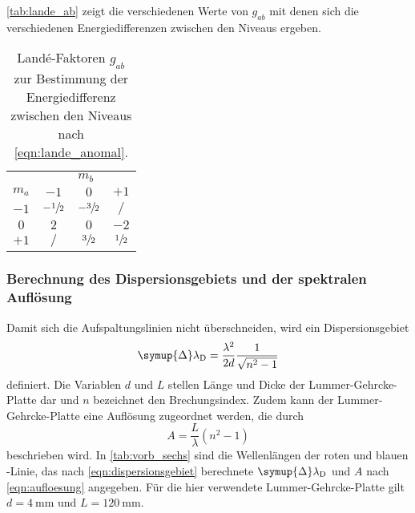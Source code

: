     \autoref{tab:lande_ab} zeigt die verschiedenen Werte von $g_{ab}$ mit denen sich die verschiedenen Energiedifferenzen zwischen den Niveaus ergeben.

    \begin{table}
        \centering
        \caption{Landé-Faktoren $g_{ab}$ zur Bestimmung der Energiedifferenz zwischen den Niveaus nach \autoref{eqn:lande_anomal}.}
        \label{tab:lande_ab}
        \begin{tabular}{c c c c}
            \toprule
            & \multicolumn{3}{c}{$m_b$}  \\
            \cmidrule(lr){2-4}
            {$m_a$} & {$-1$} & {$0$} & {$+1$} \\
            \midrule
            $-1$ & $- \sfrac{1}{2}$ & $- \sfrac{3}{2}$ & $/$ \\
            $0$  & $2$              & $0$              & $-2$ \\
            $+1$ & $/$              & $\sfrac{3}{2}$   & $\sfrac{1}{2}$ \\
            \bottomrule
        \end{tabular}
    \end{table}


\subsubsection{Berechnung des Dispersionsgebiets und der spektralen Auflösung}

    Damit sich die Aufspaltungslinien nicht überschneiden,
    wird ein Dispersionsgebiet
    \begin{equation}
        \symup{\Delta}\lambda_\text{D} = \frac{\lambda^2}{2d} \frac{1}{\sqrt{n^2 - 1}}
        \label{eqn:dispersionsgebiet}
    \end{equation}
    definiert.
    Die Variablen $d$ und $L$ stellen Länge und Dicke der Lummer-Gehrcke-Platte dar
    und $n$ bezeichnet den Brechungsindex.
    Zudem kann der Lummer-Gehrcke-Platte eine Auflösung zugeordnet werden,
    die durch
    \begin{equation}
        A = \frac{L}{\lambda} (n^2 -1)
        \label{eqn:aufloesung}
    \end{equation}
    beschrieben wird.
    In \autoref{tab:vorb_sechs} sind die Wellenlängen der roten und blauen -Linie,
    das nach \autoref{eqn:dispersionsgebiet} berechnete $\symup{\Delta}\lambda_\text{D}$
    und $A$ nach \autoref{eqn:aufloesung} angegeben.
    Für die hier verwendete Lummer-Gehrcke-Platte gilt
    $d = \SI{4}{\milli\meter}$ und
    $L = \SI{120}{\milli\meter}$.

